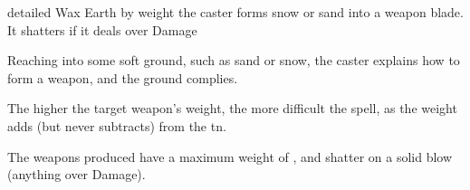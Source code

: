  {detailed}%
  {Wax}%
  {Earth}%
  {by \gls{weight}}%
  {the caster forms snow or sand into a weapon blade. It shatters if it deals over  Damage}%
  {
    Reaching into some soft ground, such as sand or snow, the caster explains how to form a weapon, and the ground complies.

    The higher the target weapon's \gls{weight}, the more difficult the spell, as the \gls{weight} adds (but never subtracts) from the \gls{tn}.

    The weapons produced have a maximum \gls{weight} of , and shatter on a solid blow (anything over  Damage).
  }

